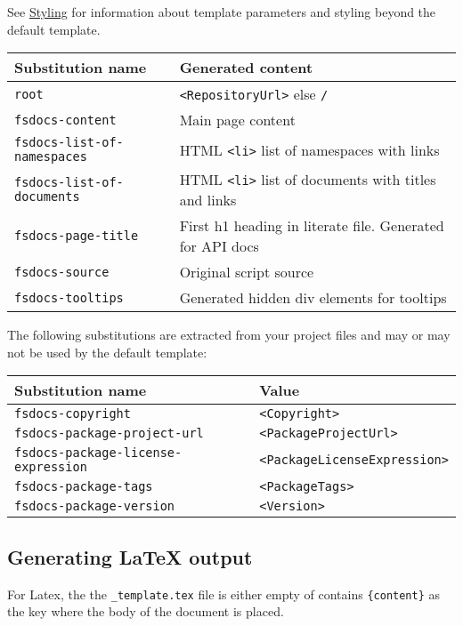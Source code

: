 \documentclass{article}
\begin{document}
See \href{styling.html}{Styling} for information about template parameters and styling beyond the default template.
\begin{tabular}{|l|l|}\hline
\textbf{Substitution name} & \textbf{Generated content}\\ \hline\hline
\texttt{root} & \texttt{<RepositoryUrl>} else \texttt{/}\\ \hline
\texttt{fsdocs-content} & Main page content\\ \hline
\texttt{fsdocs-list-of-namespaces} & HTML \texttt{<li>} list of namespaces with links\\ \hline
\texttt{fsdocs-list-of-documents} & HTML \texttt{<li>} list of documents with  titles and links\\ \hline
\texttt{fsdocs-page-title} & First h1 heading in literate file. Generated for API docs\\ \hline
\texttt{fsdocs-source} & Original script source\\ \hline
\texttt{fsdocs-tooltips} & Generated hidden div elements for tooltips\\ \hline
\end{tabular}



The following substitutions are extracted from your project files and may or may not be used by the default
template:
\begin{tabular}{|l|l|}\hline
\textbf{Substitution name} & \textbf{Value}\\ \hline\hline
\texttt{fsdocs-copyright} & \texttt{<Copyright>}\\ \hline
\texttt{fsdocs-package-project-url} & \texttt{<PackageProjectUrl>}\\ \hline
\texttt{fsdocs-package-license-expression} & \texttt{<PackageLicenseExpression>}\\ \hline
\texttt{fsdocs-package-tags} & \texttt{<PackageTags>}\\ \hline
\texttt{fsdocs-package-version} & \texttt{<Version>}\\ \hline
\end{tabular}

\subsection*{Generating LaTeX output}



For Latex, the the \texttt{\_template.tex} file is either empty of contains \texttt{\{content\}} as the key where the body
of the document is placed.
\end{document}
